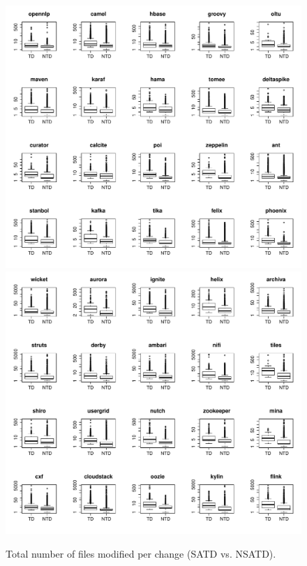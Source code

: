 \begin{figure}[tb]
	\centering
	\includegraphics[width=120mm]{figures/chapter4/rq3_td_nf_logged_1}
	\includegraphics[width=120mm]{figures/chapter4/rq3_td_nf_logged_2}
	\caption{Total number of files modified per change (SATD vs. NSATD).}
	\label{figure:total_files_td_vs_ntd}
\end{figure}


